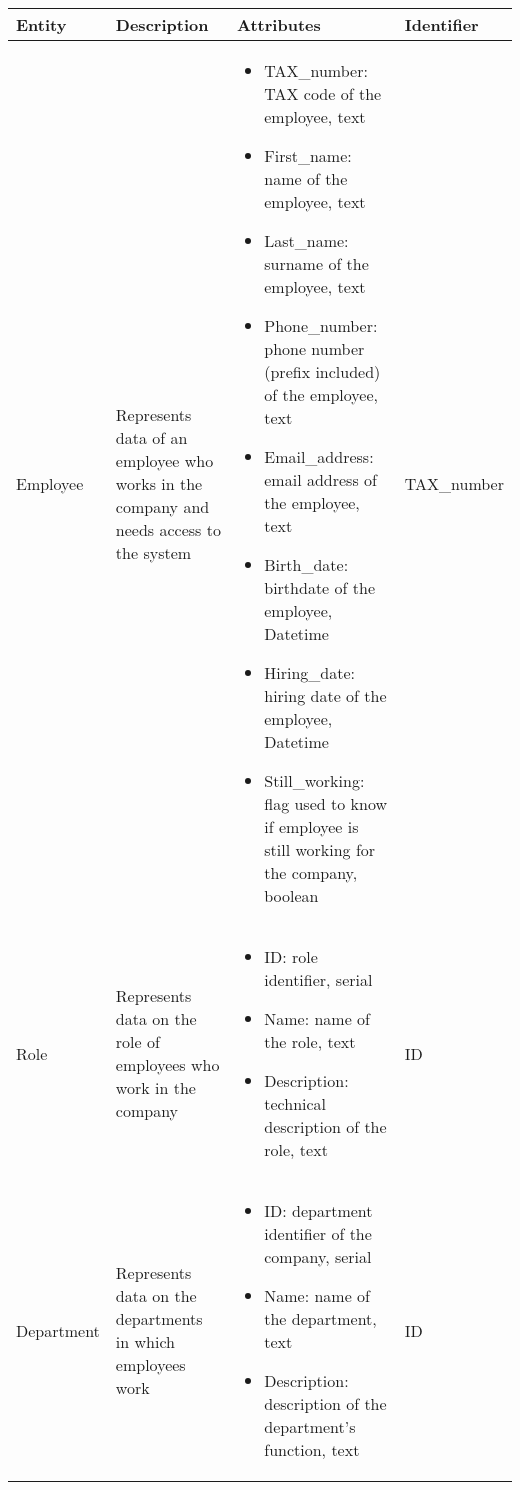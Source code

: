 \begin{longtable}{|p{}|p{} |p{}|p{} |}
    \hline
    \textbf{Entity} & \textbf{Description} & \textbf{Attributes} & \textbf{Identifier}  \\\hline

    Employee & Represents data of an employee who works in the company and needs access to the system &
    \begin{itemize}
        \vspace{-1em}
        \item TAX\_number:   TAX code of the employee, text
        \item First\_name:   name of the employee, text
        \item Last\_name:   surname of the employee, text
        \item Phone\_number:   phone number (prefix included) of the employee, text
        \item Email\_address:   email address of the employee, text
        \item Birth\_date:   birthdate of the employee, Datetime
        \item Hiring\_date:   hiring date of the employee, Datetime
        \item Still\_working: flag used to know if employee is still working for the company, boolean
    \end{itemize}
    &  TAX\_number \\\hline

    Role & Represents data on the role of employees who work in the company &
    \begin{itemize}
        \vspace{-1em}
        \item ID:   role identifier, serial
        \item Name:   name of the role, text
        \item Description:   technical description of the role, text
    \end{itemize}
    &  ID \\\hline

    Department & Represents data on the departments in which employees work &
    \begin{itemize}
        \vspace{-1em}
        \item ID:   department identifier of the company, serial
        \item Name:   name of the department, text
        \item Description:   description of the department's function, text
    \end{itemize}
    &  ID \\\hline


\end{longtable}

